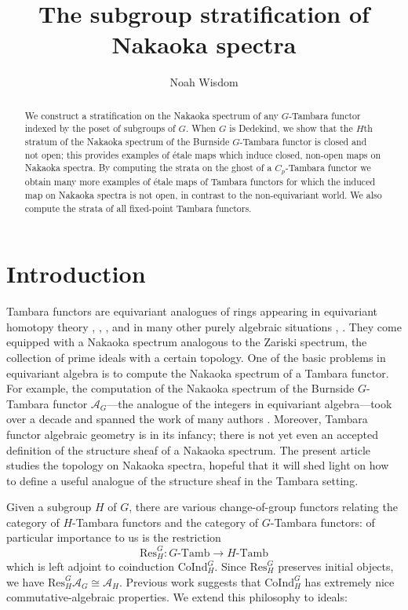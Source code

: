 \documentclass[11pt,dvipsnames]{amsart}
\title{The subgroup stratification of Nakaoka spectra}
\author[N. Wisdom]{Noah Wisdom}
\date{}
\newcommand{\A}{\mathcal{A}}
\theoremstyle{BoldRemark}
\newcommand{\Res}{\mathrm{Res}}
\newcommand{\Coind}{\mathrm{CoInd}}
\newcommand{\Tamb}{\mathrm{Tamb}}
\begin{document}
\begin{abstract}
    We construct a stratification on the Nakaoka spectrum of any $G$-Tambara functor indexed by the poset of subgroups of $G$. When $G$ is Dedekind, we show that the $H$th stratum of the Nakaoka spectrum of the Burnside $G$-Tambara functor is closed and not open; this provides examples of \'{e}tale maps which induce closed, non-open maps on Nakaoka spectra. By computing the strata on the ghost of a $C_p$-Tambara functor we obtain many more examples of \'{e}tale maps of Tambara functors for which the induced map on Nakaoka spectra is not open, in contrast to the non-equivariant world. We also compute the strata of all fixed-point Tambara functors.
\end{abstract}

\maketitle
\tableofcontents

\section{Introduction}

Tambara functors are equivariant analogues of rings appearing in equivariant homotopy theory \cite[Section 7.2]{Bru07}, \cite[Theorem 1.4]{AB18}, \cite{CHLL24,GKM26}, and in many other purely algebraic situations \cite[Section 3]{Tam93}, \cite{Bru05,Nak10,Sul23}. They come equipped with a Nakaoka spectrum analogous to the Zariski spectrum, the collection of prime ideals with a certain topology. One of the basic problems in equivariant algebra is to compute the Nakaoka spectrum of a Tambara functor. For example, the computation of the Nakaoka spectrum of the Burnside $G$-Tambara functor $\A_G$---the analogue of the integers in equivariant algebra---took over a decade and spanned the work of many authors \cite{Nak11a,Nak14,CG23,4DS,4DSC}. Moreover, Tambara functor algebraic geometry is in its infancy; there is not yet even an accepted definition of the structure sheaf of a Nakaoka spectrum. The present article studies the topology on Nakaoka spectra, hopeful that it will shed light on how to define a useful analogue of the structure sheaf in the Tambara setting.

Given a subgroup $H$ of $G$, there are various change-of-group functors relating the category of $H$-Tambara functors and the category of $G$-Tambara functors: of particular importance to us is the restriction 
\[ 
    \Res_H^G : G \text{-} \Tamb \rightarrow H \text{-} \Tamb 
\] 
which is left adjoint to coinduction $\Coind_H^G$. Since $\Res_H^G$ preserves initial objects, we have $\Res_H^G \A_G \cong \A_H$. Previous work \cite{SSW24,Wis25a} suggests that $\Coind_H^G$ has extremely nice commutative-algebraic properties. We extend this philosophy to ideals:
\end{document}
